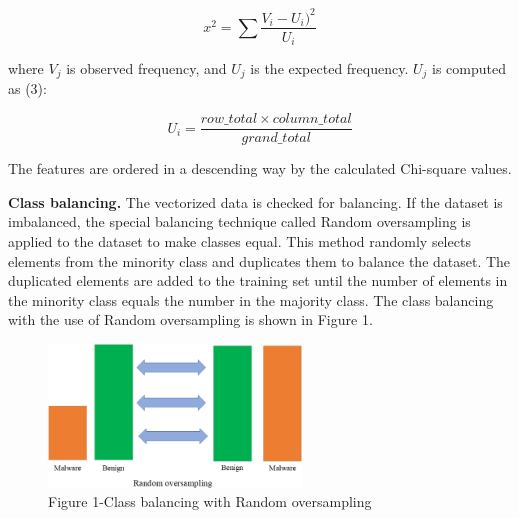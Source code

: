 \begin{multicols}{2}
\begin{equation}
x^2=\sum\frac{V_i-U_i)^2}{U_i}
\end{equation}


where $V_j$ is observed frequency, and $U_j$ is the expected frequency. $U_j$ is computed as (3):

\begin{equation}
U_i = \frac{row\text{\_}total \times column\text{\_}total}{grand\text{\_}total}
\end{equation}

The features are ordered in a descending way by the calculated
Chi-square values.

{\bfseries Class balancing.} The vectorized data is checked for balancing.
If the dataset is imbalanced, the special balancing technique called
Random oversampling is applied to the dataset to make classes equal.
This method randomly selects elements from the minority class and
duplicates them to balance the dataset. The duplicated elements are
added to the training set until the number of elements in the minority
class equals the number in the majority class. The class balancing with
the use of Random oversampling is shown in Figure 1.
\end{multicols}

\begin{figure}[H]
	\centering
	\includegraphics[width=0.6\textwidth]{media/ict/image38}
	\caption*{Figure 1-Class balancing with Random oversampling}
\end{figure}

